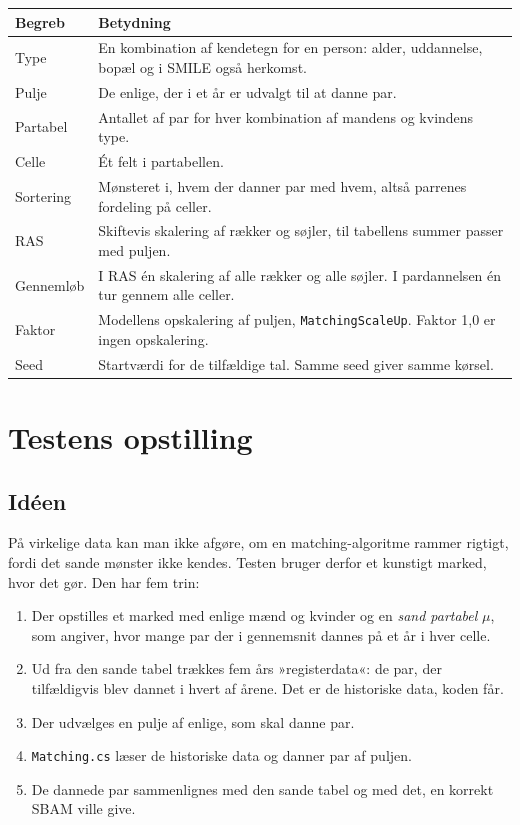\documentclass[11pt,a4paper]{article}
\newcommand{\kode}[1]{\texttt{#1}}
\begin{document}
\begin{center}
\begin{tabular}{@{}lp{11.3cm}@{}}
\toprule
Begreb & Betydning \\
\midrule
Type & En kombination af kendetegn for en person: alder, uddannelse, bopæl og i SMILE også herkomst. \\
Pulje & De enlige, der i et år er udvalgt til at danne par. \\
Partabel & Antallet af par for hver kombination af mandens og kvindens type. \\
Celle & Ét felt i partabellen. \\
Sortering & Mønsteret i, hvem der danner par med hvem, altså parrenes fordeling på celler. \\
RAS & Skiftevis skalering af rækker og søjler, til tabellens summer passer med puljen. \\
Gennemløb & I RAS én skalering af alle rækker og alle søjler. I pardannelsen én tur gennem alle celler. \\
Faktor & Modellens opskalering af puljen, \kode{MatchingScaleUp}. Faktor 1,0 er ingen opskalering. \\
Seed & Startværdi for de tilfældige tal. Samme seed giver samme kørsel. \\
\bottomrule
\end{tabular}
\end{center}


\section{Testens opstilling}\label{sec:opstilling}

\subsection{Idéen}

På virkelige data kan man ikke afgøre, om en matching-algoritme rammer rigtigt, fordi det sande
mønster ikke kendes. Testen bruger derfor et kunstigt marked, hvor det gør. Den har fem trin:

\begin{enumerate}
\item Der opstilles et marked med enlige mænd og kvinder og en \emph{sand partabel} $\mu$, som
angiver, hvor mange par der i gennemsnit dannes på et år i hver celle.
\item Ud fra den sande tabel trækkes fem års »registerdata«: de par, der tilfældigvis blev dannet i
hvert af årene. Det er de historiske data, koden får.
\item Der udvælges en pulje af enlige, som skal danne par.
\item \kode{Matching.cs} læser de historiske data og danner par af puljen.
\item De dannede par sammenlignes med den sande tabel og med det, en korrekt SBAM ville give.
\end{enumerate}
\end{document}
